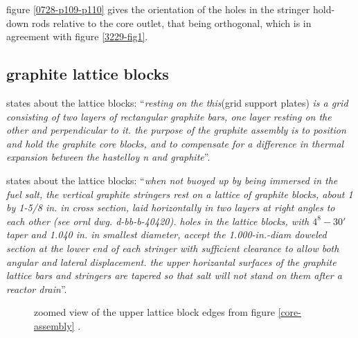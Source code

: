 \documentclass{article}
\newcommand*{\mrsarchive}{../../msr-archive}%
\begin{document}
figure \ref{0728-p109-p110} gives the orientation of the holes in the stringer hold-down rods relative to the core outlet, that being orthogonal, which is in agreement with figure \ref{3229-fig1}.


\subsection{graphite lattice blocks}
\parencite[page 20]{ornl-tm-3229} states about the lattice blocks: \enquote{\textit{resting on the this}(grid support plates)\textit{ is a grid consisting of two layers of rectangular graphite bars, one layer resting on the other and perpendicular to it. the purpose of the graphite assembly is to position and hold the graphite core blocks, and to compensate for a difference in thermal expansion between the hastelloy n and graphite}}.

\parencite[page 79 and 81]{ornl-tm-0728} states about the lattice blocks: \enquote{\textit{when not buoyed up by being immersed in the fuel salt, the vertical graphite stringers rest on a lattice of graphite blocks, about 1 by 1-5/8 in. in cross section, laid horizontally in two layers at right angles to each other (see ornl dwg. d-bb-b-40420). holes in the lattice blocks, with $4^8-30'$ taper and 1.040 in. in smallest diameter, accept the 1.000-in.-diam doweled section at the lower end of each stringer with sufficient clearance to allow both angular and lateral displacement. the upper horizantal surfaces of the graphite lattice bars and stringers are tapered so that salt will not stand on them after a reactor drain}}.

\begin{figure}[H]
  \centering
  \caption{zoomed view of the upper lattice block edges from figure \ref{core-assembly} \parencite{ornl}.}
  \label{core-assembly-zoom}
\end{figure}

\end{document}
